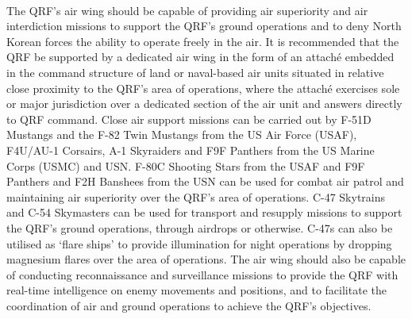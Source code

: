 \documentclass[a4paper,12pt]{article}
\begin{document}
{	\\
	The QRF's air wing should be capable of providing air superiority and air interdiction missions to support the QRF's ground operations and to deny North Korean forces the ability to operate freely in the air. It is recommended that the QRF be supported by a dedicated air wing in the form of an attaché embedded in the command structure of land or naval-based air units situated in relative close proximity to the QRF's area of operations, where the attaché exercises sole or major jurisdiction over a dedicated section of the air unit and answers directly to QRF command. Close air support missions can be carried out by F-51D Mustangs and the F-82 Twin Mustangs from the US Air Force (USAF), F4U/AU-1 Corsairs, A-1 Skyraiders and F9F Panthers from the US Marine Corps (USMC) and USN. F-80C Shooting Stars from the USAF and F9F Panthers and F2H Banshees from the USN can be used for combat air patrol and maintaining air superiority over the QRF's area of operations. C-47 Skytrains and C-54 Skymasters can be used for transport and resupply missions to support the QRF's ground operations, through airdrops or otherwise. C-47s can also be utilised as `flare ships' to provide illumination for night operations by dropping magnesium flares over the area of operations. The air wing should also be capable of conducting reconnaissance and surveillance missions to provide the QRF with real-time intelligence on enemy movements and positions, and to facilitate the coordination of air and ground operations to achieve the QRF's objectives.
}

\clearpage
\end{document}
